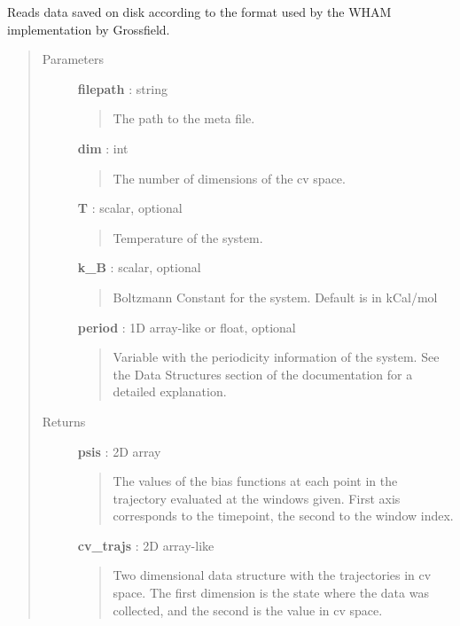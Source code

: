 \documentclass[letterpaper,10pt,english]{sphinxmanual}
\begin{document}

\begin{fulllineitems}
\label{modules/usutils:usutils.data_from_WHAMmeta}
Reads data saved on disk according to the format used by the WHAM implementation by Grossfield.
\begin{quote}\begin{description}
\item[{Parameters}] \leavevmode
\textbf{filepath} : string
\begin{quote}

The path to the meta file.
\end{quote}

\textbf{dim} : int
\begin{quote}

The number of dimensions of the cv space.
\end{quote}

\textbf{T} : scalar, optional
\begin{quote}

Temperature of the system.
\end{quote}

\textbf{k\_B} : scalar, optional
\begin{quote}

Boltzmann Constant for the system. Default is in kCal/mol
\end{quote}

\textbf{period} : 1D array-like or float, optional
\begin{quote}

Variable with the periodicity information of the system.  See the Data Structures section of the documentation for a detailed explanation.
\end{quote}

\item[{Returns}] \leavevmode
\textbf{psis} : 2D array
\begin{quote}

The values of the bias functions at each point in the trajectory evaluated at the windows given.  First axis corresponds to the timepoint, the second to the window index.
\end{quote}

\textbf{cv\_trajs} : 2D array-like
\begin{quote}

Two dimensional data structure with the trajectories in cv space.  The first dimension is the state where the data was collected, and the second is the value in cv space.
\end{quote}

\end{description}\end{quote}

\end{fulllineitems}
\end{document}
